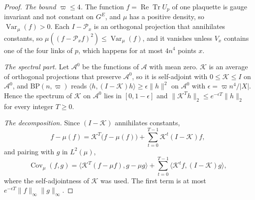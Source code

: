 \documentclass[aps,prd,twocolumn,superscriptaddress,nofootinbib,longbibliography,floatfix,amsmath,amssymb,10pt]{revtex4-2}
\theoremstyle{definition}
\theoremstyle{remark}
\newcommand{\ReTr}{\operatorname{Re}\operatorname{Tr}}
\newcommand{\Cov}{\operatorname{Cov}}
\newcommand{\Var}{\operatorname{Var}}
\newcommand{\ip}[2]{\langle #1,#2\rangle}
\begin{document}
\begin{proof}
\emph{The bound $\varpi\le4$.} The function $f=\ReTr U_p$ of one plaquette
is gauge invariant and not constant on $G^E$, and $\mu$ has a positive
density, so $\Var_\mu(f)>0$. Each $I-\mathcal P_x$ is an orthogonal
projection that annihilates constants, so $\mu((f-\mathcal P_xf)^2)\le
\Var_\mu(f)$, and it vanishes unless $V_x$ contains one of the four links
of $p$, which happens for at most $4n^4$ points $x$.

\emph{The spectral part.} Let $\mathcal A^0$ be the functions of $\mathcal
A$ with mean zero. $\mathcal K$ is an average of orthogonal projections that
preserve $\mathcal A^0$, so it is self-adjoint with $0\le\mathcal K\le I$ on
$\mathcal A^0$, and $\mathrm{BP}(n,\varpi)$ reads $\ip h{(I-\mathcal K)h}\ge
\epsilon\lVert h\rVert^2$ on $\mathcal A^0$ with $\epsilon=\varpi n^4/\lvert X
\rvert$. Hence the spectrum of $\mathcal K$ on $\mathcal A^0$ lies in
$[0,1-\epsilon]$ and $\lVert\mathcal K^Th\rVert_2\le e^{-\epsilon T}\lVert
h\rVert_2$ for every integer $T\ge0$.

\emph{The decomposition.} Since $(I-\mathcal K)$ annihilates constants,
\[
f-\mu(f)=\mathcal K^T\bigl(f-\mu(f)\bigr)+\sum_{t=0}^{T-1}\mathcal K^t
(I-\mathcal K)f ,
\]
and pairing with $g$ in $L^2(\mu)$,
\[
\Cov_\mu(f,g)=\ip{\mathcal K^T(f-\mu f)}{g-\mu g}+\sum_{t=0}^{T-1}
\ip{\mathcal K^tf}{(I-\mathcal K)g},
\]
where the self-adjointness of $\mathcal K$ was used. The first term is at
most $e^{-\epsilon T}\lVert f\rVert_\infty\lVert g\rVert_\infty$.


\end{proof}
\end{document}
